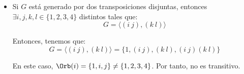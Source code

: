 \begin{ejercicio}
\begin{enumerate}
\begin{itemize}
\begin{itemize}
\begin{itemize}
                    \item Si $G$ está generado por dos transposiciones disjuntas, entonces $\exists i,j,k,l\in \{1, 2, 3, 4\}$ distintos tales que:
                    \begin{equation*}
                        G = \langle (i\ j), (k\ l) \rangle
                    \end{equation*}

                    Entonces, tenemos que:
                    \begin{equation*}
                        G = \langle (i\ j), (k\ l) \rangle = \{1, (i\ j), (k\ l), (i\ j)(k\ l)\}
                    \end{equation*}

                    En este caso, $\Orb(i) = \{1,i,j\}\neq \{1, 2, 3, 4\}$. Por tanto, no es transitivo.


\end{itemize}
\end{itemize}
\end{itemize}
\end{enumerate}
\end{ejercicio}
